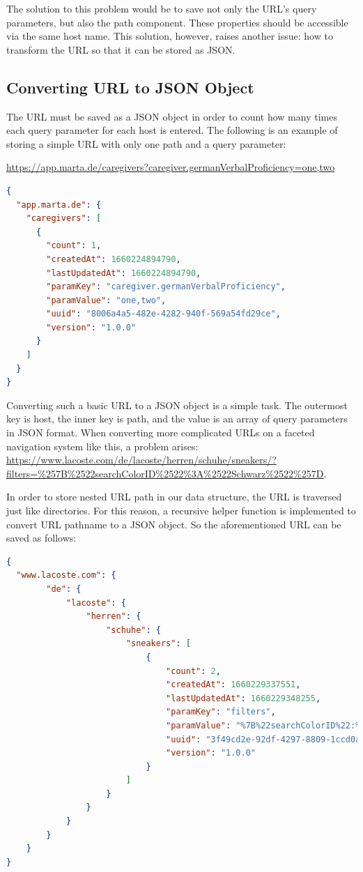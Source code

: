 The solution to this problem would be to save not only the URL's query parameters, but also the path component. These properties should be accessible via the same host name. This solution, however, raises another issue: how to transform the URL so that it can be stored as JSON.

\subsection*{Converting URL to JSON Object}
The URL must be saved as a JSON object in order to count how many times each query parameter for each host is entered. The following is an example of storing a simple URL with only one path and a query parameter:

\noindent\begin{center}
  \url{https://app.marta.de/caregivers?caregiver.germanVerbalProficiency=one,two}
\end{center}

\begin{lstlisting}[language=json, caption={A record example from app.marta.de (JSON)}]
{
  "app.marta.de": {
    "caregivers": [
      {
        "count": 1,
        "createdAt": 1660224894790,
        "lastUpdatedAt": 1660224894790,
        "paramKey": "caregiver.germanVerbalProficiency",
        "paramValue": "one,two",
        "uuid": "8006a4a5-482e-4282-940f-569a54fd29ce",
        "version": "1.0.0"
      }
    ]
  }
}
\end{lstlisting}

Converting such a basic URL to a JSON object is a simple task. The outermost key is host, the inner key is path, and the value is an array of query parameters in JSON format. When converting more complicated URLs on a faceted navigation system like this, a problem arises: \url{https://www.lacoste.com/de/lacoste/herren/schuhe/sneakers/?filters=%257B%2522searchColorID%2522%3A%2522Schwarz%2522%257D}.

In order to store nested URL path in our data structure, the URL is traversed just like directories. For this reason, a recursive helper function is implemented to convert URL pathname to a JSON object. So the aforementioned URL can be saved as follows:

\begin{lstlisting}[language=json, caption={Record with long pathname (JSON)}, label={lst:recordLongPathname}]
{
  "www.lacoste.com": {
		"de": {
			"lacoste": {
				"herren": {
					"schuhe": {
						"sneakers": [
							{
								"count": 2,
								"createdAt": 1660229337551,
								"lastUpdatedAt": 1660229348255,
								"paramKey": "filters",
								"paramValue": "%7B%22searchColorID%22:%22Schwarz%22%7D",
								"uuid": "3f49cd2e-92df-4297-8809-1ccd0a7a8e89",
								"version": "1.0.0"
							}
						]
					}
				}
			}
		}
	}
}
\end{lstlisting}

